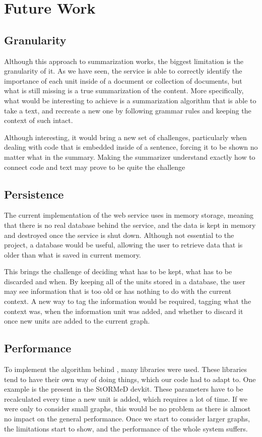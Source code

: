 \section{Future Work}\label{sec:implementationIssues}
\subsection{Granularity}
Although this approach to summarization works, the biggest limitation is the granularity of it. As we have seen, the service is able to correctly identify the importance of each unit inside of a document or collection of documents, but what is still missing is a true summarization of the content. More specifically, what would be interesting to achieve is a summarization algorithm that is able to take a text, and recreate a new one by following grammar rules and keeping the context of such intact.

Although interesting, it would bring a new set of challenges, particularly when dealing with code that is embedded inside of a sentence, forcing it to be shown no matter what in the summary. Making the summarizer understand exactly how to connect code and text may prove to be quite the challenge

\subsection{Persistence}
The current implementation of the web service uses in memory storage, meaning that there is no real database behind the service, and the data is kept in memory and destroyed once the service is shut down. Although not essential to the project, a database would be useful, allowing the user to retrieve data that is older than what is saved in current memory. 

This brings the challenge of deciding what has to be kept, what has to be discarded and when. By keeping all of the units stored in a database, the user may see information that is too old or has nothing to do with the current context. A new way to tag the information would be required, tagging what the context was, when the information unit was added, and whether to discard it once new units are added to the current graph.

\subsection{Performance}
To implement the algorithm behind \projectName, many libraries were used. These libraries tend to have their own way of doing things, which our code had to adapt to. One example is the  present in the StORMeD devkit. These parameters have to be recalculated every time a new unit is added, which requires a lot of time. If we were only to consider small graphs, this would be no problem as there is almost no impact on the general performance. Once we start to consider larger graphs, the limitations start to show, and the performance of the whole system suffers.